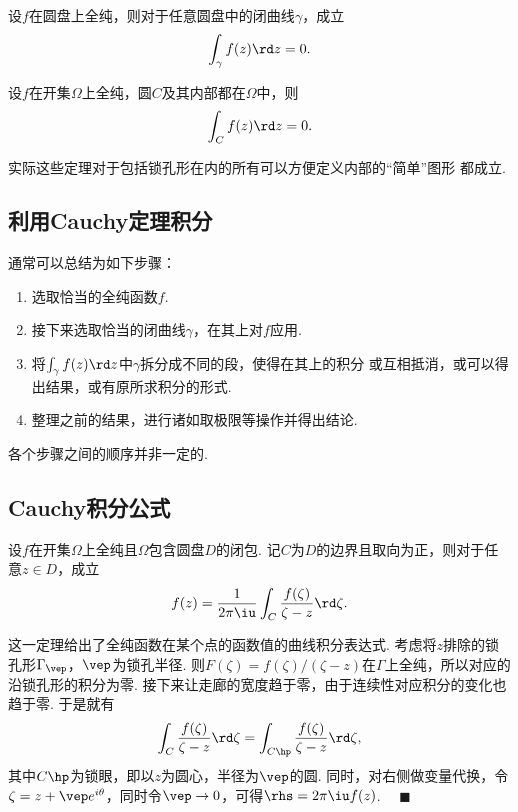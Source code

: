   \begin{thm}[圆盘上的Cauchy定理]
    设$f$在圆盘上全纯，则对于任意圆盘中的闭曲线$\gamma$，成立
    \[
      \int_\gamma f(z)\rd z = 0.
    \]
  \end{thm}

  \begin{cor}
    \label{cor: Cauchy定理}
    设$f$在开集$\Omega$上全纯，圆$C$及其内部都在$\Omega$中，则
    \[
      \int_C f(z)\rd z = 0.
    \]
  \end{cor}
  \remark
    实际这些定理对于包括锁孔形在内的所有可以方便定义内部的“简单”图形
    都成立.

\subsection{利用Cauchy定理积分}

  通常可以总结为如下步骤：
  \begin{enumerate}
    \item 选取恰当的全纯函数$f$.
    \item 接下来选取恰当的闭曲线$\gamma$，在其上对$f$应用.
    \item 将$\int_\gamma f(z)\rd z$中$\gamma$拆分成不同的段，使得在其上的积分
      或互相抵消，或可以得出结果，或有原所求积分的形式.
    \item 整理之前的结果，进行诸如取极限等操作并得出结论.
  \end{enumerate}
  各个步骤之间的顺序并非一定的.

\subsection{Cauchy积分公式}

  \begin{thm}[Cauchy]
    \label{thm: Cauchy公式}
    设$f$在开集$\Omega$上全纯且$\Omega$包含圆盘$D$的闭包.
    记$C$为$D$的边界且取向为正，则对于任意$z\in D$，成立
    \[
      f(z) = \frac{1}{2\pi\iu}\int_C\frac{f(\zeta)}{\zeta-z}\rd\zeta.
    \]
  \end{thm}
  \remark
    这一定理给出了全纯函数在某个点的函数值的曲线积分表达式.
  \proof
    考虑将$z$排除的锁孔形$\Gamma_{\vep}$，$\vep$为锁孔半径. 则$F(\zeta)
    =f(\zeta)/(\zeta-z)$在$\Gamma$上全纯，所以对应的沿锁孔形的积分为零.
    接下来让走廊的宽度趋于零，由于连续性对应积分的变化也趋于零. 于是就有
    \[
      \int_C \frac{f(\zeta)}{\zeta-z}\rd\zeta
      = \int_{C\hp}\frac{f(\zeta)}{\zeta-z}\rd\zeta,
    \]
    其中$C\hp$为锁眼，即以$z$为圆心，半径为$\vep$的圆. 同时，对右侧做变量代换，令
    $\zeta = z+\vep e^{i\theta}$，同时令$\vep\to 0$，可得$\rhs=2\pi\iu f(z)$.
    $\quad\blacksquare$

